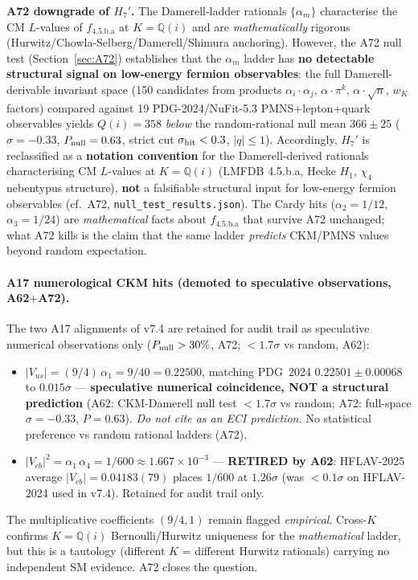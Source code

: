 \documentclass[a4paper,11pt]{article}
\newcommand{\fLM}{f_{\text{4.5.b.a}}}
\newcommand{\Qi}{\mathbb{Q}(i)}
\theoremstyle{definition}
\theoremstyle{remark}
\begin{document}
\noindent\textbf{A72 downgrade of $H_7'$.}
The Damerell-ladder rationals $\{\alpha_m\}$ characterise the CM
$L$-values of $\fLM$ at $K=\Qi$ and are \emph{mathematically}
rigorous (Hurwitz/Chowla-Selberg/Damerell/Shimura anchoring).
However, the A72 null test (Section~\ref{sec:A72}) establishes
that the $\alpha_m$ ladder has \textbf{no detectable structural
signal on low-energy fermion observables}: the full
Damerell-derivable invariant space (150 candidates from products
$\alpha_i\cdot\alpha_j$, $\alpha\cdot\pi^k$, $\alpha\cdot\sqrt{n}$,
$w_K$ factors) compared against 19 PDG-2024/NuFit-5.3
PMNS$+$lepton$+$quark observables yields
$Q(i)=358$ \emph{below} the random-rational null mean
$366\pm25$ ($\sigma=-0.33$, $P_{\rm null}=0.63$, strict cut
$\sigma_{\rm hit}<0.3$, $|q|\le 1$).
Accordingly, $H_7'$ is reclassified as a \textbf{notation
convention} for the Damerell-derived rationals characterising
CM $L$-values at $K=\Qi$ (LMFDB 4.5.b.a, Hecke $H_1$,
$\chi_4$ nebentypus structure), \textbf{not} a falsifiable
structural input for low-energy fermion observables
(cf.~A72, \texttt{null\_test\_results.json}).
The Cardy hits ($\alpha_2=1/12$, $\alpha_3=1/24$) are
\emph{mathematical} facts about $\fLM$ that survive A72 unchanged;
what A72 kills is the claim that the same ladder \emph{predicts}
CKM/PMNS values beyond random expectation.

\paragraph{A17 numerological CKM hits (\textbf{demoted} to
speculative observations, A62$+$A72).}
The two A17 alignments of v7.4 are retained for audit trail
as speculative numerical observations only
($P_{\rm null}>30\%$, A72; $<1.7\sigma$ vs random, A62):
\begin{itemize}
  \item $|V_{us}| = (9/4)\,\alpha_1 = 9/40 = 0.22500$, matching
    PDG~2024 $0.22501\pm 0.00068$ to $0.015\sigma$ ---
    \textbf{speculative numerical coincidence, NOT a structural
    prediction} (A62: CKM-Damerell null test $<1.7\sigma$ vs
    random; A72: full-space $\sigma=-0.33$, $P=0.63$).
    \emph{Do not cite as an ECI prediction.}
    No statistical preference vs random rational ladders (A72).
  \item $|V_{cb}|^{2} = \alpha_1\,\alpha_4 = 1/600 \approx
    1.667\times 10^{-3}$ ---
    \textbf{RETIRED by A62}: HFLAV-2025 average
    $|V_{cb}|=0.04183(79)$ places $1/600$ at $1.26\sigma$
    (was $<0.1\sigma$ on HFLAV-2024 used in v7.4).
    Retained for audit trail only.
\end{itemize}
The multiplicative coefficients $(9/4,1)$ remain flagged
\emph{empirical}.  Cross-$K$ confirms $K=\Qi$ Bernoulli/Hurwitz
uniqueness for the \emph{mathematical} ladder, but this is a
tautology (different $K$ = different Hurwitz rationals) carrying
no independent SM evidence.  A72 closes the question.
\end{document}
